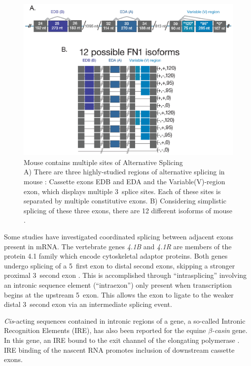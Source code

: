     \begin{figure} %
      \centering 
      \includegraphics{Figures/Intro/Fibronectin.eps}
      \caption[Mouse \fn{} contains multiple sites of Alternative Splicing]
      {
        Mouse \fn{} contains multiple sites of Alternative Splicing\\[0.25cm]
        A) There are three highly-studied regions of alternative splicing in mouse \fn{}: Cassette exons EDB and EDA and the Variable(V)-region exon, which displays multiple 3\textprime~splice sites.  Each of these sites is separated by multiple constitutive exons. B) Considering simplistic splicing of these three exons, there are 12 different isoforms of mouse \fn{}.
        }
      \label{Intro:fig:mouseFn1}
      \end{figure}

    Some studies have investigated coordinated splicing between adjacent exons present in mRNA. The vertebrate genes \textit{4.1B} and \textit{4.1R} are members of the protein 4.1 family which encode cytoskeletal adaptor proteins. Both genes undergo splicing of a 5\textprime~first exon to distal second exons, skipping a stronger proximal 3\textprime~second exon \citep{Parra2008, Parra2012}. This is accomplished through ``intrasplicing'' involving an intronic sequence element (``intraexon'') only present when transcription begins at the upstream 5\textprime~exon. This allows the exon to ligate to the weaker distal 3\textprime~second exon via an intermediate splicing event.

    \textit{Cis}-acting sequences contained in intronic regions of a gene, a so-called Intronic Recognition Elements (IRE), has also been reported for the equine \textit{$\beta$-casin} gene. In this gene, an IRE bound to the exit channel of the elongating polymerase \citep{Lenasi2006}. IRE binding of the nascent RNA promotes inclusion of downstream cassette exons.

